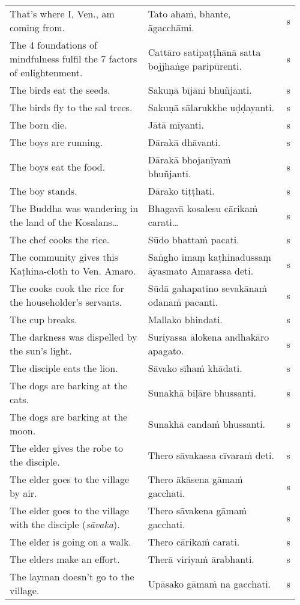 \documentclass[a5paper]{memoir}
\begin{document}
\begin{longtable}{L{0.48\linewidth} L{0.48\linewidth} H}
That's where I, Ven., am coming from. & Tato ahaṁ, bhante, āgacchāmi. & s\\[0pt]
The 4 foundations of mindfulness fulfil the 7 factors of enlightenment. & Cattāro satipaṭṭhānā satta bojjhaṅge paripūrenti. & s\\[0pt]
The birds eat the seeds. & Sakuṇā bījāni bhuñjanti. & s\\[0pt]
The birds fly to the sal trees. & Sakuṇā sālarukkhe uḍḍayanti. & s\\[0pt]
The born die. & Jātā mīyanti. & s\\[0pt]
The boys are running. & Dārakā dhāvanti. & s\\[0pt]
The boys eat the food. & Dārakā bhojanīyaṁ bhuñjanti. & s\\[0pt]
The boy stands. & Dārako tiṭṭhati. & s\\[0pt]
The Buddha was wandering in the land of the Kosalans\ldots{} & Bhagavā kosalesu cārikaṁ carati\ldots{} & s\\[0pt]
The chef cooks the rice. & Sūdo bhattaṁ pacati. & s\\[0pt]
The community gives this Kaṭhina-cloth to Ven. Amaro. & Saṅgho imaṃ kaṭhinadussaṃ āyasmato Amarassa deti. & s\\[0pt]
The cooks cook the rice for the householder's servants. & Sūdā gahapatino sevakānaṁ odanaṁ pacanti. & s\\[0pt]
The cup breaks. & Mallako bhindati. & s\\[0pt]
The darkness was dispelled by the sun's light. & Suriyassa ālokena andhakāro apagato. & s\\[0pt]
The disciple eats the lion. & Sāvako sīhaṁ khādati. & s\\[0pt]
The dogs are barking at the cats. & Sunakhā biḷāre bhussanti. & s\\[0pt]
The dogs are barking at the moon. & Sunakhā candaṁ bhussanti. & s\\[0pt]
The elder gives the robe to the disciple. & Thero sāvakassa cīvaraṁ deti. & s\\[0pt]
The elder goes to the village by air. & Thero ākāsena gāmaṁ gacchati. & s\\[0pt]
The elder goes to the village with the disciple (\emph{sāvaka}). & Thero sāvakena gāmaṁ gacchati. & s\\[0pt]
The elder is going on a walk. & Thero cārikaṁ carati. & s\\[0pt]
The elders make an effort. & Therā viriyaṁ ārabhanti. & s\\[0pt]
The layman doesn't go to the village. & Upāsako gāmaṁ na gacchati. & s\\[0pt]

\end{longtable}
\end{document}
